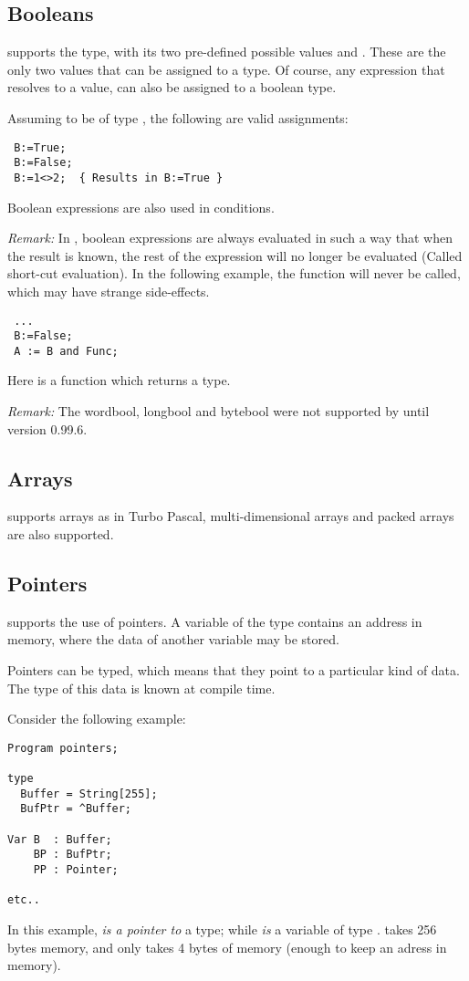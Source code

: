 \documentclass{report}
\begin{document}
\subsection{Booleans}
\fpc supports the  type, with its two pre-defined possible
values  and . These are the only two values that can be
assigned to a  type. Of course, any expression that resolves
to a  value, can also be assigned to a boolean type.

Assuming  to be of type , the following are valid
assignments:
\begin{verbatim}
 B:=True;
 B:=False;
 B:=1<>2;  { Results in B:=True }
\end{verbatim}
Boolean expressions are also used in conditions.

{\em Remark:} In \fpc, boolean expressions are always evaluated in such a
way that when the result is known, the rest of the expression will no longer
be evaluated (Called short-cut evaluation). In the following example, the function  will never
be called, which may have strange side-effects.
\begin{verbatim}
 ...
 B:=False;
 A := B and Func;
\end{verbatim} 
Here  is a function which returns a  type.

{\em Remark:} The wordbool, longbool and bytebool were not supported
by \fpc until version 0.99.6.

\subsection{Arrays}
\fpc supports arrays as in Turbo Pascal, multi-dimensional arrays 
and packed arrays are also supported.

\subsection{Pointers}
\fpc supports the use of pointers. A variable of the type 
contains an address in memory, where the data of another variable may be 
stored.

Pointers can be typed, which means that they point to a particular kind of
data. The type of this data is known at compile time.

Consider the following example:
\begin{CodEx}
\begin{verbatim}
Program pointers;

type 
  Buffer = String[255];
  BufPtr = ^Buffer;

Var B  : Buffer;
    BP : BufPtr;
    PP : Pointer;

etc..
\end{verbatim}
\end{CodEx}
In this example,  {\em is a pointer to} a  type; while 
{\em is} a variable of type .  takes 256 bytes memory,
and  only takes 4 bytes of memory (enough to keep an adress in
memory).
\end{document}

